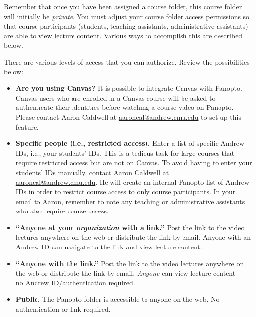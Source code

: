 \begin{important}
	Remember that once you have been assigned a course folder, this course folder will initially be \emph{private}. You must adjust your course folder access permissions so that course participants (students, teaching assistants, administrative assistants) are able to view lecture content. Various ways to accomplish this are described below.
\end{important}

\begin{gram}
	There are various levels of access that you can authorize. Review the possibilities below:

	\begin{itemize}
		\item \textbf{Are you using Canvas?} It is possible to integrate Canvas with Panopto. Canvas users who are enrolled in a Canvas course will be asked to authenticate their identities before watching a course video on Panopto. Please contact Aaron Caldwell at \href{mailto:aaroncal@andrew.cmu.edu?subject=Canvas and Panopto}{aaroncal@andrew.cmu.edu} to set up this feature.
		\item \textbf{Specific people (i.e., restricted access).} Enter a list of specific Andrew IDs, i.e., your students’ IDs. This is a tedious task for large courses that require restricted access but are not on Canvas. To avoid having to enter your students’ IDs manually, contact Aaron Caldwell at \href{mailto:aaroncal@andrew.cmu.edu?subject=Restrict Course Access}{aaroncal@andrew.cmu.edu}. He will create an internal Panopto list of Andrew IDs in order to restrict course access to only course participants. In your email to Aaron, remember to note any teaching or administrative assistants who also require course access.
		\item \textbf{``Anyone at your \emph{organization} with a link.''} Post the link to the video lectures anywhere on the web or distribute the link by email. Anyone with an Andrew ID can navigate to the link and view lecture content.
		\item \textbf{``Anyone with the link.''} Post the link to the video lectures anywhere on the web or distribute the link by email. \emph{Anyone} can view lecture content --- no Andrew ID/authentication required.
		\item \textbf{Public.} The Panopto folder is accessible to anyone on the web. No authentication or link required.
	\end{itemize}
\end{gram}

